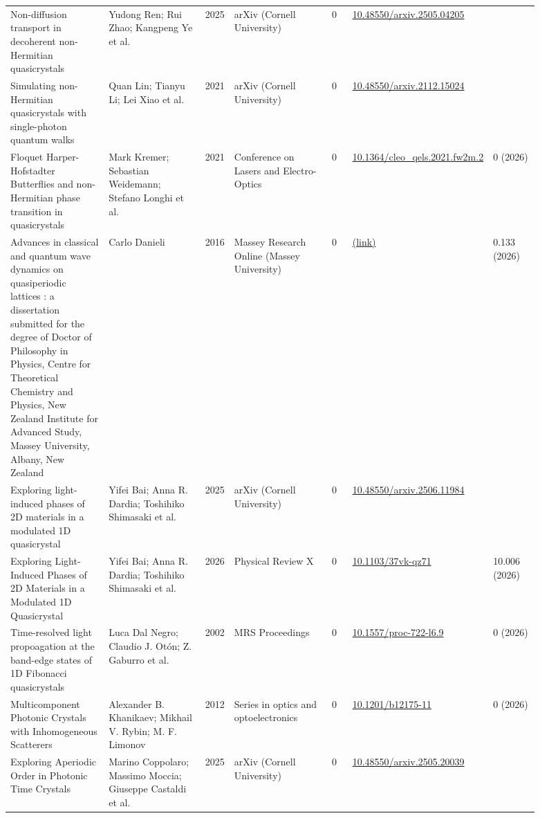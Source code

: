 \documentclass[10pt,a4paper]{article}
\begin{document}
{\begin{longtable}{p{0.192\linewidth}p{0.192\linewidth}p{0.043\linewidth}p{0.192\linewidth}p{0.043\linewidth}p{0.132\linewidth}p{0.096\linewidth}}
Non-diffusion transport in decoherent non-Hermitian quasicrystals & Yudong Ren; Rui Zhao; Kangpeng Ye et al. & 2025 & arXiv (Cornell University) & 0 & \href{https://doi.org/10.48550/arxiv.2505.04205}{10.48550/arxiv.2505.04205} &  \\
Simulating non-Hermitian quasicrystals with single-photon quantum walks & Quan Lin; Tianyu Li; Lei Xiao et al. & 2021 & arXiv (Cornell University) & 0 & \href{https://doi.org/10.48550/arxiv.2112.15024}{10.48550/arxiv.2112.15024} &  \\
Floquet Harper-Hofstadter Butterflies and non-Hermitian phase transition in quasicrystals & Mark Kremer; Sebastian Weidemann; Stefano Longhi et al. & 2021 & Conference on Lasers and Electro-Optics & 0 & \href{https://doi.org/10.1364/cleo_qels.2021.fw2m.2}{10.1364/cleo\_qels.2021.fw2m.2} & 0 (2026) \\
Advances in classical and quantum wave dynamics on quasiperiodic lattices : a dissertation submitted for the degree of Doctor of Philosophy in Physics, Centre for Theoretical Chemistry and Physics, New Zealand Institute for Advanced Study, Massey University, Albany, New Zealand & Carlo Danieli & 2016 & Massey Research Online (Massey University) & 0 & \href{https://openalex.org/W2698686299}{(link)} & 0.133 (2026) \\
Exploring light-induced phases of 2D materials in a modulated 1D quasicrystal & Yifei Bai; Anna R. Dardia; Toshihiko Shimasaki et al. & 2025 & arXiv (Cornell University) & 0 & \href{https://doi.org/10.48550/arxiv.2506.11984}{10.48550/arxiv.2506.11984} &  \\
Exploring Light-Induced Phases of 2D Materials in a Modulated 1D Quasicrystal & Yifei Bai; Anna R. Dardia; Toshihiko Shimasaki et al. & 2026 & Physical Review X & 0 & \href{https://doi.org/10.1103/37vk-qz71}{10.1103/37vk-qz71} & 10.006 (2026) \\
Time-resolved light propoagation at the band-edge states of 1D Fibonacci quasicrystals & Luca Dal Negro; Claudio J. Otón; Z. Gaburro et al. & 2002 & MRS Proceedings & 0 & \href{https://doi.org/10.1557/proc-722-l6.9}{10.1557/proc-722-l6.9} & 0 (2026) \\
Multicomponent Photonic Crystals with Inhomogeneous Scatterers & Alexander B. Khanikaev; Mikhail V. Rybin; M. F. Limonov & 2012 & Series in optics and optoelectronics & 0 & \href{https://doi.org/10.1201/b12175-11}{10.1201/b12175-11} & 0 (2026) \\
Exploring Aperiodic Order in Photonic Time Crystals & Marino Coppolaro; Massimo Moccia; Giuseppe Castaldi et al. & 2025 & arXiv (Cornell University) & 0 & \href{https://doi.org/10.48550/arxiv.2505.20039}{10.48550/arxiv.2505.20039} &  \\

\end{longtable}}
\end{document}

